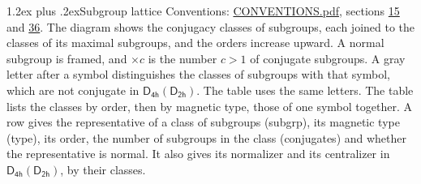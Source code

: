 \documentclass[10pt,a4paper]{article}
\makeatletter
\renewcommand\section{\@startsection{section}{1}{\z@}{-3ex plus -1ex minus -.2ex}%
  {1.2ex plus .2ex}{\normalfont\large\sffamily\bfseries\color{parttitle}}}
\numberwithin{equation}{section}
\newcommand{\grp}[1]{\mathsf{#1}}
\makeatother
\begin{document}
\section{Subgroup lattice}\label{s:subgroups}
Conventions: \href{../../CONVENTIONS.pdf}{CONVENTIONS.pdf}, sections \href{../../../rotation/CONVENTIONS.pdf\#conv.15}{15} and \href{../../CONVENTIONS.pdf\#conv.36}{36}.
The diagram shows the conjugacy classes of subgroups, each joined to the classes of its maximal subgroups, and the orders increase upward. \label{n:index.conjugates.c}\label{n:mark.conjugates}A normal subgroup is framed, and ${\times}c$ is the number $c > 1$ of conjugate subgroups. \label{n:mark.letter}A gray letter after a symbol distinguishes the classes of subgroups with that symbol, which are not conjugate in $\grp{D_{4h}}(\grp{D_{2h}})$. The table uses the same letters. The table lists the classes by order, then by magnetic type, those of one symbol together. \label{n:head.subgroup}\label{n:head.magnetic.type}\label{n:head.order}\label{n:head.conjugates}\label{n:head.normal}A row gives the representative of a class of subgroups (subgrp), its magnetic type (type), its order, the number of subgroups in the class (conjugates) and whether the representative is normal. \label{n:head.normalizer}\label{n:head.centralizer}It also gives its normalizer and its centralizer in $\grp{D_{4h}}(\grp{D_{2h}})$, by their classes. 
\end{document}
